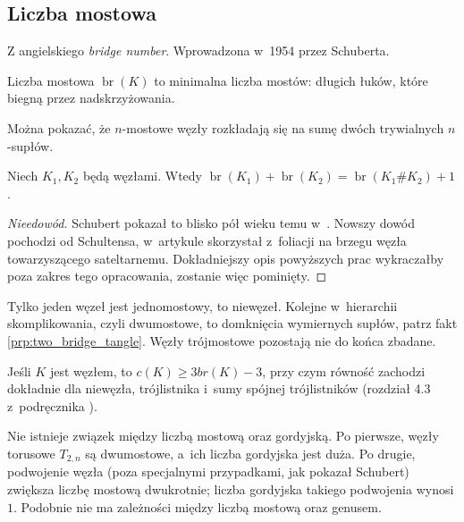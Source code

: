 
\subsection{Liczba mostowa} %
\label{sub:bridge_index}
Z angielskiego \emph{bridge number}.
Wprowadzona w~1954 przez Schuberta.
\begin{definition}
    Liczba mostowa $\operatorname{br}(K)$ to minimalna liczba mostów:
    długich łuków, które biegną przez nadskrzyżowania.
\end{definition}

Można pokazać, że $n$-mostowe węzły rozkładają się na sumę dwóch trywialnych $n$-supłów.

\begin{proposition}
    Niech $K_1, K_2$ będą węzłami.
    Wtedy $\operatorname{br} (K_1) + \operatorname{br}(K_2) = \operatorname{br}(K_1 \# K_2) + 1$.
\end{proposition}

\begin{proof}[Nieedowód]
    Schubert pokazał to blisko pół wieku temu w~\cite{schubert54}.
    Nowszy dowód pochodzi od Schultensa, w~artykule \cite{schultens03} skorzystał z~foliacji na brzegu węzła towarzyszącego sateltarnemu.
    Dokładniejszy opis powyższych prac wykraczałby poza zakres tego opracowania, zostanie więc pominięty.
\end{proof}

Tylko jeden węzeł jest jednomostowy, to niewęzeł.
Kolejne w~hierarchii skomplikowania, czyli dwumostowe,
to domknięcia wymiernych supłów, patrz fakt \ref{prp:two_bridge_tangle}.
Węzły trójmostowe pozostają nie do końca zbadane.

\begin{conjecture}
    Jeśli $K$ jest węzłem, to $c(K) \ge 3 br(K) - 3$, przy czym równość zachodzi dokładnie dla niewęzła, trójlistnika i~sumy spójnej trójlistników (rozdział 4.3 z~podręcznika \cite{murasugi96}).
\end{conjecture}

Nie istnieje związek między liczbą mostową oraz gordyjską.
Po pierwsze, węzły torusowe $T_{2,n}$ są dwumostowe, a~ich liczba gordyjska jest duża.
Po drugie, podwojenie węzła (poza specjalnymi przypadkami, jak pokazał Schubert) zwiększa liczbę mostową dwukrotnie; liczba gordyjska takiego podwojenia wynosi $1$.
Podobnie nie ma zależności między liczbą mostową oraz genusem.

